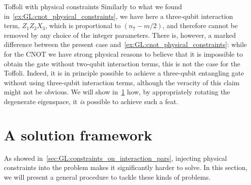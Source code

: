 \begin{examplebox}[label={ex:GL:toffoli_physical_constraints}]{Toffoli with physical constraints}
Similarly to what we found in~\cref{ex:GL:cnot_physical_constraints}, we have here a three-qubit interaction term, $Z_1 Z_2 X_3$, which is proportional to $(n_7 - m/2)$, and therefore cannot be removed by any choice of the integer parameters.
There is, however, a marked difference between the present case and~\cref{ex:GL:cnot_physical_constraints}: while for the CNOT we have strong physical reasons to believe that it is impossible to obtain the gate without two-qubit interaction terms, this is not the case for the Toffoli.
Indeed, it is in principle possible to achieve a three-qubit entangling gate without using three-qubit interaction terms, although the veracity of this claim might not be obvious.
We will show in~\cref{sec:GL:solution_framework} how, by appropriately rotating the degenerate eigenspace, it \textit{is} possible to achieve such a feat.
\end{examplebox}

\section{A solution framework}
\label{sec:GL:solution_framework}

As showed in~\cref{sec:GL:constraints_on_interaction_pars}, injecting physical constraints into the problem makes it significantly harder to solve. In this section, we will present a general procedure to tackle these kinds of problems.


